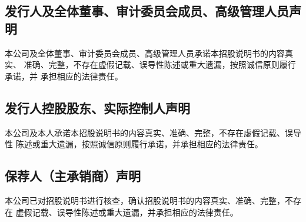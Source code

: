 
\subsection{发行人及全体董事、审计委员会成员、高级管理人员声明}

本公司及全体董事、审计委员会成员、高级管理人员承诺本招股说明书的内容真实、
准确、完整，不存在虚假记载、误导性陈述或重大遗漏，按照诚信原则履行承诺，并
承担相应的法律责任。





\clearpage
\subsection{发行人控股股东、实际控制人声明}

本公司及本人承诺本招股说明书的内容真实、准确、完整，不存在虚假记载、误导性
陈述或重大遗漏，按照诚信原则履行承诺，并承担相应的法律责任。




\clearpage
\subsection{保荐人（主承销商）声明}

本公司已对招股说明书进行核查，确认招股说明书的内容真实、准确、完整，不存在
虚假记载、误导性陈述或重大遗漏，并承担相应的法律责任。


